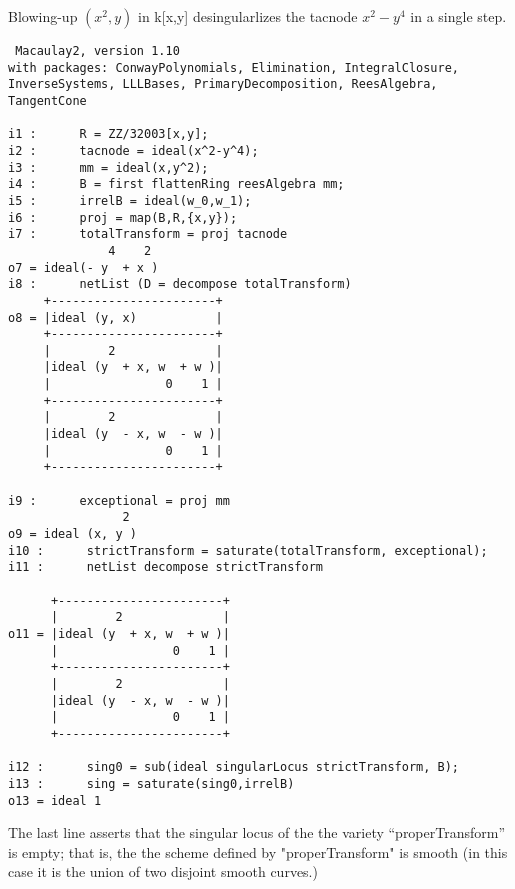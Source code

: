 \documentclass[twoside,12pt, leqno]{amsart}
\begin{document}
\begin{example}
Blowing-up $(x^2,y)$ in k[x,y] desingularlizes the tacnode $x^2-y^4$ in a single step. 
\end{example}
\begin{verbatim}
 Macaulay2, version 1.10
with packages: ConwayPolynomials, Elimination, IntegralClosure, InverseSystems, LLLBases, PrimaryDecomposition, ReesAlgebra, TangentCone

i1 :      R = ZZ/32003[x,y];
i2 :      tacnode = ideal(x^2-y^4);
i3 :      mm = ideal(x,y^2);
i4 :      B = first flattenRing reesAlgebra mm;
i5 :      irrelB = ideal(w_0,w_1);
i6 :      proj = map(B,R,{x,y});
i7 :      totalTransform = proj tacnode
              4    2
o7 = ideal(- y  + x )
i8 :      netList (D = decompose totalTransform)
     +-----------------------+
o8 = |ideal (y, x)           |
     +-----------------------+
     |        2              |
     |ideal (y  + x, w  + w )|
     |                0    1 |
     +-----------------------+
     |        2              |
     |ideal (y  - x, w  - w )|
     |                0    1 |
     +-----------------------+

i9 :      exceptional = proj mm
                2
o9 = ideal (x, y )
i10 :      strictTransform = saturate(totalTransform, exceptional);
i11 :      netList decompose strictTransform

      +-----------------------+
      |        2              |
o11 = |ideal (y  + x, w  + w )|
      |                0    1 |
      +-----------------------+
      |        2              |
      |ideal (y  - x, w  - w )|
      |                0    1 |
      +-----------------------+

i12 :      sing0 = sub(ideal singularLocus strictTransform, B);
i13 :      sing = saturate(sing0,irrelB)
o13 = ideal 1
\end{verbatim}
The last line asserts that the singular locus of the the variety ``properTransform'' is empty;
that is, the the scheme defined by "properTransform" is smooth (in this case it is the union
of two disjoint smooth curves.)
\end{document}
